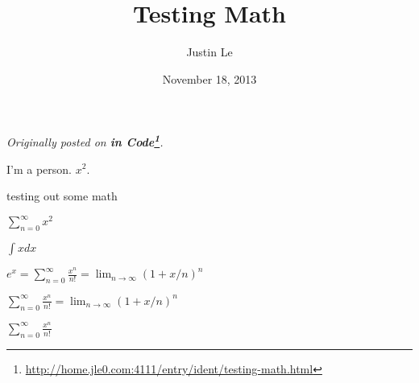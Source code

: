 \documentclass[]{article}
\title{Testing Math}
\author{Justin Le}
\date{November 18, 2013}
\renewcommand{\href}[2]{#2\footnote{\url{#1}}}
\begin{document}
\maketitle

\emph{Originally posted on
\textbf{\href{http://home.jle0.com:4111/entry/ident/testing-math.html}{in
Code}}.}

I'm a person. \(x^2\).

testing out some math

\(\sum_{n=0}^\infty x^2\)

\(\int x dx\)

\(e^x = \sum_{n=0}^\infty \frac{x^n}{n!} = \lim_{n\rightarrow\infty} (1+x/n)^n\)

\(\sum_{n=0}^\infty \frac{x^n}{n!} = \lim_{n\rightarrow\infty} (1+x/n)^n\)

\(\sum_{n=0}^\infty \frac{x^n}{n!}\)
\end{document}
